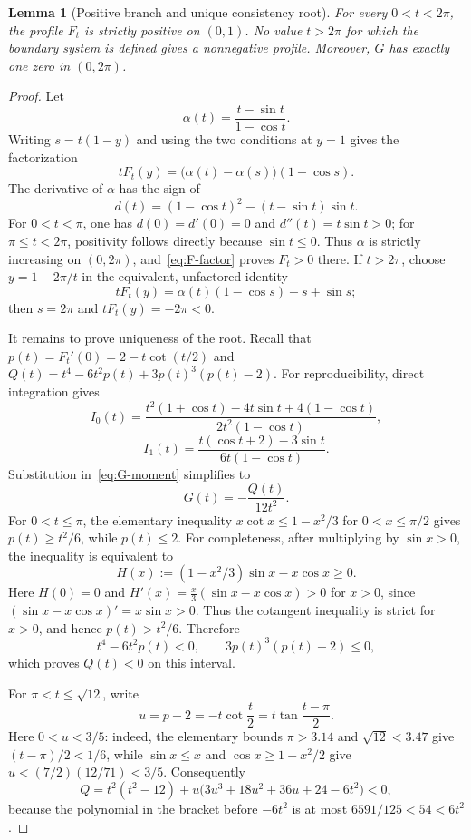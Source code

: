 \documentclass[11pt]{article}
\newtheorem{lemma}[theorem]{Lemma}
\theoremstyle{definition}
\theoremstyle{remark}
\begin{document}
\begin{lemma}[Positive branch and unique consistency root]\label{lem:branch}
For every $0<t<2\pi$, the profile $F_t$ is strictly positive on $(0,1)$. No value $t>2\pi$ for which the boundary system is defined gives a nonnegative profile. Moreover, $G$ has exactly one zero in $(0,2\pi)$.
\end{lemma}
\begin{proof}
Let
\[
 \alpha(t)=\frac{t-\sin t}{1-\cos t}.
\]
Writing $s=t(1-y)$ and using the two conditions at $y=1$ gives the factorization
\begin{equation}\label{eq:F-factor}
 tF_t(y)=\bigl(\alpha(t)-\alpha(s)\bigr)(1-\cos s).
\end{equation}
The derivative of $\alpha$ has the sign of
\[
 d(t)=(1-\cos t)^2-(t-\sin t)\sin t.
\]
For $0<t<\pi$, one has $d(0)=d'(0)=0$ and $d''(t)=t\sin t>0$; for $\pi\leq t<2\pi$, positivity follows directly because $\sin t\leq0$. Thus $\alpha$ is strictly increasing on $(0,2\pi)$, and~\eqref{eq:F-factor} proves $F_t>0$ there. If $t>2\pi$, choose $y=1-2\pi/t$ in the equivalent, unfactored identity
\[
 tF_t(y)=\alpha(t)(1-\cos s)-s+\sin s;
\]
then $s=2\pi$ and $tF_t(y)=-2\pi<0$.

It remains to prove uniqueness of the root. Recall that
$p(t)=F_t'(0)=2-t\cot(t/2)$ and
$Q(t)=t^4-6t^2p(t)+3p(t)^3(p(t)-2)$.
For reproducibility, direct integration gives
\[
 I_0(t)=
 \frac{t^2(1+\cos t)-4t\sin t+4(1-\cos t)}
      {2t^2(1-\cos t)},
\]
\[
 I_1(t)=
 \frac{t(\cos t+2)-3\sin t}{6t(1-\cos t)}.
\]
Substitution in~\eqref{eq:G-moment} simplifies to
\begin{equation}\label{eq:G-Q}
 G(t)=-\frac{Q(t)}{12t^2}.
\end{equation}
For $0<t\leq\pi$, the elementary inequality
$x\cot x\leq1-x^2/3$ for $0<x\leq\pi/2$ gives
$p(t)\geq t^2/6$, while $p(t)\leq2$. For completeness, after multiplying by
$\sin x>0$, the inequality is equivalent to
\[
 H(x):=(1-x^2/3)\sin x-x\cos x\geq0.
\]
Here $H(0)=0$ and
$H'(x)=\frac{x}{3}(\sin x-x\cos x)>0$ for $x>0$, since
$(\sin x-x\cos x)'=x\sin x>0$. Thus the cotangent inequality is strict
for $x>0$, and hence $p(t)>t^2/6$. Therefore
\[
 t^4-6t^2p(t)<0,
 \qquad
 3p(t)^3(p(t)-2)\leq0,
\]
which proves $Q(t)<0$ on this interval.

For $\pi<t\leq\sqrt{12}$, write
\[
 u=p-2=-t\cot\frac t2=t\tan\frac{t-\pi}{2}.
\]
Here $0<u<3/5$: indeed, the elementary bounds $\pi>3.14$ and
$\sqrt{12}<3.47$ give $(t-\pi)/2<1/6$, while
$\sin x\leq x$ and $\cos x\geq1-x^2/2$ give
$u<(7/2)(12/71)<3/5$. Consequently
\[
 Q=t^2(t^2-12)
 +u\bigl(3u^3+18u^2+36u+24-6t^2\bigr)<0,
\]
because the polynomial in the bracket before $-6t^2$ is at most
$6591/125<54<6t^2$.


\end{proof}
\end{document}
